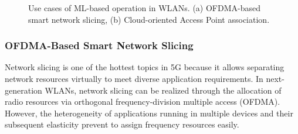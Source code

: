 \documentclass[twocolumn]{article}
\begin{document}
\begin{figure}[ht!]
	\centering
	\caption{Use cases of ML-based operation in WLANs. (a) OFDMA-based smart network slicing, (b) Cloud-oriented Access Point association.}
	\label{fig:use_cases}
\end{figure}

\subsubsection{OFDMA-Based Smart Network Slicing} 
Network slicing is one of the hottest topics in 5G because it allows separating network resources virtually to meet diverse application requirements. In next-generation WLANs, network slicing can be realized through the allocation of radio resources via orthogonal frequency-division multiple access (OFDMA). However, the heterogeneity of applications running in multiple devices and their subsequent elasticity prevent to assign frequency resources easily. 
\end{document}
